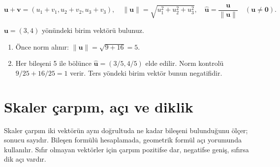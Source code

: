 {\small\[
\mathbf u+\mathbf v=(u_1+v_1,u_2+v_2,u_3+v_3),\quad \|\mathbf u\|=\sqrt{u_1^2+u_2^2+u_3^2},\quad \widehat{\mathbf u}=\frac{\mathbf u}{\|\mathbf u\|}\quad(\mathbf u\ne\mathbf0).
\]}
\begin{tcolorbox}[title={Örnek 1.1 | Birim vektör},colframe=accent]\(\mathbf u=(3,4)\) yönündeki birim vektörü bulunuz.
\par{}\end{tcolorbox}
\begin{tcolorbox}[title={Adım adım çözüm},colback=green!3!white,colframe=green]\begin{enumerate}
\item Önce norm alınır: \(\|\mathbf u\|=\sqrt{9+16}=5\).
\item Her bileşeni 5 ile bölünce \(\widehat{\mathbf u}=(3/5,4/5)\) elde edilir. Norm kontrolü \(9/25+16/25=1\) verir. Ters yöndeki birim vektör bunun negatifidir.
\end{enumerate}\end{tcolorbox}
\section{Skaler çarpım, açı ve diklik}
Skaler çarpım iki vektörün aynı doğrultuda ne kadar bileşeni bulunduğunu ölçer; sonucu sayıdır. Bileşen formülü hesaplamada, geometrik formül açı yorumunda kullanılır. Sıfır olmayan vektörler için çarpım pozitifse dar, negatifse geniş, sıfırsa dik açı vardır.


